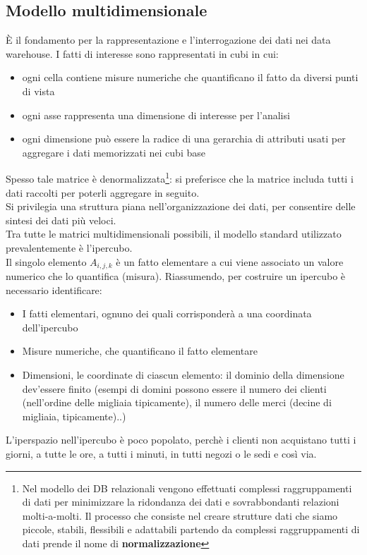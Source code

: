\subsection{Modello multidimensionale}
\`E il fondamento per la rappresentazione e l'interrogazione dei dati nei data warehouse.
I fatti di interesse sono rappresentati in cubi in cui:
\begin{itemize}
	\item ogni cella contiene misure numeriche che quantificano il fatto da diversi punti di vista
	\item ogni asse rappresenta una dimensione di interesse per l'analisi
	\item ogni dimensione pu\`o essere la radice di una gerarchia di attributi usati per aggregare i dati memorizzati nei cubi base
\end{itemize}
Spesso tale matrice \`e denormalizzata\footnote{Nel modello dei DB relazionali vengono effettuati complessi raggruppamenti di dati per minimizzare la ridondanza dei dati e sovrabbondanti relazioni molti-a-molti. Il processo che consiste nel creare strutture dati che siamo piccole, stabili, flessibili e adattabili partendo da complessi raggruppamenti di dati prende il nome di \bf normalizzazione\rm}: si preferisce che la matrice includa tutti i dati raccolti per poterli aggregare in seguito.\\
Si privilegia una struttura piana nell'organizzazione dei dati,
per consentire delle sintesi dei dati pi\`u veloci.\\
Tra tutte le matrici multidimensionali possibili, il modello standard utilizzato prevalentemente \`e l'ipercubo. \\
Il singolo elemento $A_{i,j,k}$ \`e un fatto elementare a cui viene associato un valore
numerico che lo quantifica (misura).
Riassumendo, per costruire un ipercubo \`e necessario identificare:
\begin{itemize}
	\item I fatti elementari, ognuno dei quali corrisponder\`a a una coordinata dell'ipercubo 
	\item Misure numeriche, che quantificano il fatto elementare
	\item Dimensioni, le coordinate di ciascun elemento: il dominio della dimensione dev'essere finito (esempi di domini possono essere il numero dei clienti (nell'ordine delle migliaia tipicamente), il numero	delle merci (decine di migliaia, tipicamente)..)
\end{itemize} 
L'iperspazio nell'ipercubo \`e poco popolato, perch\`e i clienti non acquistano tutti i giorni, a tutte le ore, a tutti i minuti, in tutti negozi o le sedi e cos\`i via.\\
